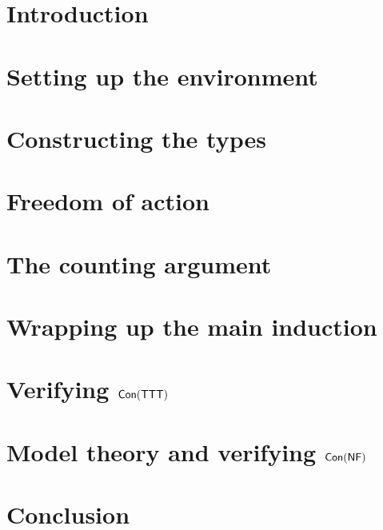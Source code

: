 \chapter{Introduction}


\chapter{Setting up the environment}


\chapter{Constructing the types}


\chapter{Freedom of action}


\chapter{The counting argument}


\chapter{Wrapping up the main induction}


\chapter{Verifying \texorpdfstring{\( \operatorname{\mathsf{Con}}(\mathsf{TTT}) \)}{Con(TTT)}}


\chapter{Model theory and verifying \texorpdfstring{\( \operatorname{\mathsf{Con}}(\mathsf{NF}) \)}{Con(NF)}}


\chapter{Conclusion}




